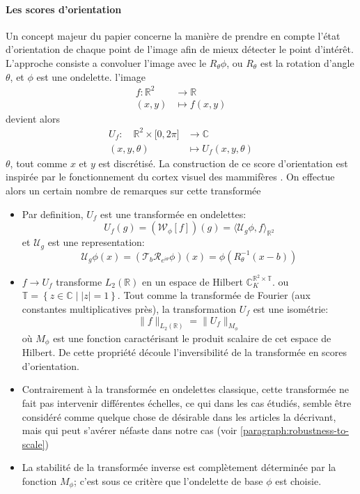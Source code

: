 \documentclass{article}
\begin{document}
\paragraph{Les scores d'orientation} 
Un concept majeur du papier concerne la manière de prendre en compte l'état
d'orientation de chaque point de l'image afin de mieux détecter le point d'intérêt.
L'approche consiste a convoluer l'image avec le $ R_{\theta} \phi $, ou $ R_{\theta} $
est la rotation d'angle $ \theta  $, et $ \phi $ est une ondelette.
l'image 
\[
    \begin{aligned}
        f: \mathbb{R}^2 &\longrightarrow \mathbb{R} \\
        (x, y) &\longmapsto f(x, y)
    \end{aligned}
\] 
devient alors 
\[
\begin{aligned}
    U_f: \quad \mathbb{R}^2\times \lbrack  0, 2 \pi \rbrack &\longrightarrow \mathbb{C} \\
    (x, y, \theta) &\longmapsto U_f(x, y, \theta)
\end{aligned}
\] 
$ \theta $, tout comme $ x $ et $ y $ est discrétisé.
La construction de ce score d'orientation est inspirée par le fonctionnement du cortex
visuel des mammifères \cite{cake2}.
On effectue alors un certain nombre de remarques sur cette transformée
\begin{itemize}
    \item Par definition, $  U_f $ est une transformée en ondelettes:
        \[
             U_f(g) =  (\mathcal W_{\phi}[f])(g)  = \langle \mathcal  U_g \phi, f
             \rangle_{\mathbb{R}^2}
        \] 
        et $ \mathcal  U_g $ est une representation:
        \[
            \mathcal  U_g \phi(x) = (\mathcal  T_b \mathcal  R_{e^{i \theta}} \phi )(x)
            = \phi \left ( R_{\theta}^{-1}(x - b) \right )
        \] 
        \item $ f  \to U_f $ transforme $ L_2(\mathbb{R}) $ en un espace de Hilbert $
        \mathbb C_K^{\mathbb{R}^2 \times \mathbb{ T }} $.\newline
        ou $ \mathbb{ T } = \left \{ z \in \mathbb{ C } \mid \lvert z \rvert  = 1 \right
        \}  $.
        Tout comme la transformée de Fourier (aux constantes multiplicatives près), la
        transformation $ U_f $ est une isométrie:
        \[
            \|f\|_{L_2(\mathbb{R})} = \|U_f\|_{M_{\phi}}
        \] 
        où $ M_{\phi} $ est une fonction caractérisant le produit scalaire de cet espace
        de Hilbert.\newline
        De cette propriété découle l'inversibilité de la transformée en scores
        d'orientation.
        \item Contrairement à la transformée en ondelettes classique, cette transformée
            ne fait pas intervenir différentes échelles, ce qui dans les cas étudiés,
            semble être considéré comme quelque chose de désirable dans les articles la
            décrivant, mais qui peut s'avérer néfaste dans notre cas (voir \ref{paragraph:robustness-to-scale}) 
        \item La stabilité de la transformée inverse est complètement déterminée par la
            fonction $ M_{\phi} $; c'est sous ce critère que l'ondelette de base $ \phi
            $ est choisie.
\end{itemize}
\end{document}
